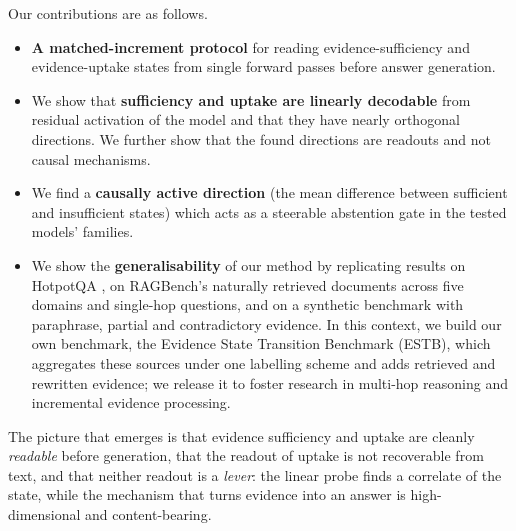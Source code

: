 Our contributions are as follows.
\begin{itemize}
  \item \textbf{A matched-increment protocol} for reading evidence-sufficiency and evidence-uptake states from single forward passes before answer generation.
  \item We show that \textbf{sufficiency and uptake are linearly decodable} from residual activation of the model and that they have nearly orthogonal directions. We further show that the found directions are readouts and not causal mechanisms.
  \item We find a \textbf{causally active direction} (the mean difference between sufficient and insufficient states) which acts as a steerable abstention gate in the tested models' families.
  \item We show the \textbf{generalisability} of our method by replicating results on HotpotQA \cite{yang2018hotpotqa}, on RAGBench's \cite{friel2024ragbench} naturally retrieved documents across five domains and single-hop questions, and on a synthetic benchmark with paraphrase, partial and contradictory evidence. In this context, we build our own benchmark, the Evidence State Transition Benchmark (ESTB), which aggregates these sources under one labelling scheme and adds retrieved and rewritten evidence; we release it to foster research in multi-hop reasoning and incremental evidence processing.
\end{itemize}
The picture that emerges is that evidence sufficiency and uptake are cleanly \emph{readable} before generation, that the readout of uptake is not recoverable from text, and that neither readout is a \emph{lever}: the linear probe finds a correlate of the state, while the mechanism that turns evidence into an answer is high-dimensional and content-bearing.
